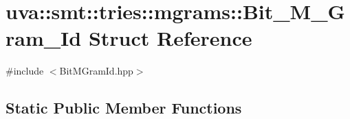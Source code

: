 \hypertarget{structuva_1_1smt_1_1tries_1_1mgrams_1_1_bit___m___gram___id}{}\section{uva\+:\+:smt\+:\+:tries\+:\+:mgrams\+:\+:Bit\+\_\+\+M\+\_\+\+Gram\+\_\+\+Id Struct Reference}
\label{structuva_1_1smt_1_1tries_1_1mgrams_1_1_bit___m___gram___id}


{\ttfamily \#include $<$Bit\+M\+Gram\+Id.\+hpp$>$}

\subsection*{Static Public Member Functions}
